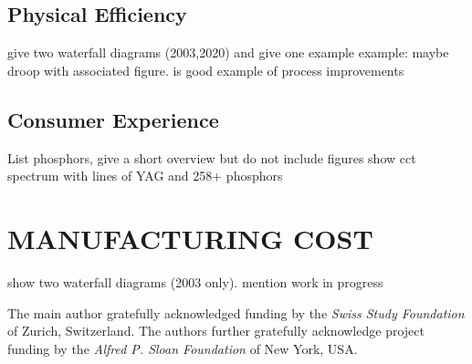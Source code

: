 \documentclass[a4paper,nocompress]{spie}  %
\begin{document}
\subsection{Physical Efficiency}

give two waterfall diagrams (2003,2020) and give one example
example: maybe droop with associated figure. is good example of process improvements

\subsection{Consumer Experience}

List phosphors, give a short overview but do not include figures
show cct spectrum with lines of YAG and 258+ phosphors

\section{MANUFACTURING COST}

show two waterfall diagrams (2003 only). mention work in progress



\clearpage
\acknowledgments %
 
The main author gratefully acknowledged funding by the \textit{Swiss Study Foundation} of Zurich, Switzerland. The authors further gratefully acknowledge project funding by the \textit{Alfred P. Sloan Foundation} of New York, USA.

\end{document}
